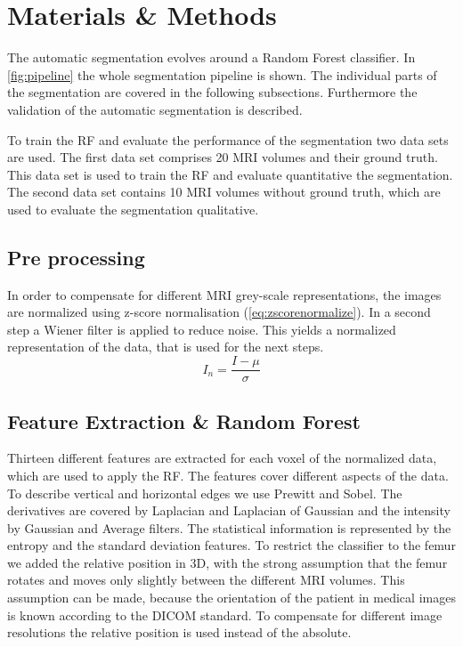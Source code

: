 \section{Materials \& Methods}
The automatic segmentation evolves around a Random Forest classifier. In \autoref{fig:pipeline} the whole segmentation pipeline is shown. The individual parts of the segmentation are covered in the following subsections. Furthermore the validation of the automatic segmentation is described.

To train the RF and evaluate the performance of the segmentation two data sets are used. The first data set comprises 20 MRI volumes and their ground truth. This data set is used to train the RF and evaluate quantitative the segmentation. The second data set contains 10 MRI volumes without ground truth, which are used to evaluate the segmentation qualitative.
\subsection{Pre processing}
In order to compensate for different MRI grey-scale representations, the images are normalized using z-score normalisation (\autoref{eq:zscorenormalize}). In a second step a Wiener filter is applied to reduce noise. This yields a normalized representation of the data, that is used for the next steps.
\begin{equation}
I_n = \frac{I - \mu}{\sigma}
\label{eq:zscorenormalize}
\end{equation}
\subsection{Feature Extraction \& Random Forest}
Thirteen different features are extracted for each voxel of the normalized data, which are used to apply the RF. The features cover different aspects of the data. To describe vertical and horizontal edges we use Prewitt and Sobel. The derivatives are covered by Laplacian and Laplacian of Gaussian and the intensity by Gaussian and Average filters. The statistical information is represented by the entropy and the standard deviation features. To restrict the classifier to the femur we added the relative position in 3D, with the strong assumption that the femur rotates and moves only slightly between the different MRI volumes. This assumption can be made, because the orientation of the patient in medical images is known according to the DICOM standard\cite{dicom-orientation}. To compensate for different image resolutions the relative position is used instead of the absolute.

